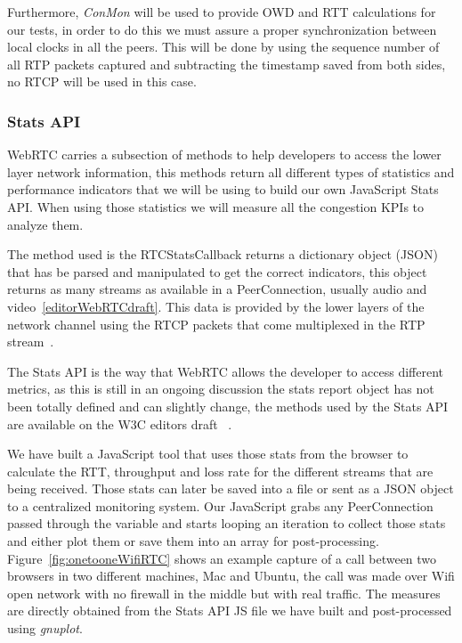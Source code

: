 Furthermore, {\it ConMon} will be used to provide OWD and RTT calculations for our tests, in order to do this we must assure a proper synchronization between local clocks in all the peers. This will be done by using the sequence number of all RTP packets captured and subtracting the timestamp saved from both sides, no RTCP will be used in this case.

\subsubsection{Stats API}

WebRTC carries a subsection of methods to help developers to access the lower layer network information, this methods return all different types of statistics and performance indicators that we will be using to build our own JavaScript Stats API. When using those statistics we will measure all the congestion KPIs to analyze them.

The method used is the RTCStatsCallback returns a dictionary object (JSON) that has be parsed and manipulated to get the correct indicators, this object returns as many streams as available in a PeerConnection, usually audio and video~\ref{editorWebRTCdraft}. This data is provided by the lower layers of the network channel using the RTCP packets that come multiplexed in the RTP stream~\cite{rtpusageIETF}.

The Stats API is the way that WebRTC allows the developer to access different metrics, as this is still in an ongoing discussion the stats report object has not been totally defined and can slightly change, the methods used by the Stats API are available on the W3C editors draft ~\cite{editorWebRTCdraft}. 

We have built a JavaScript tool that uses those stats from the browser to calculate the RTT, throughput and loss rate for the different streams that are being received. Those stats can later be saved into a file or sent as a JSON object to a centralized monitoring system. Our JavaScript grabs any PeerConnection passed through the variable and starts looping an iteration to collect those stats and either plot them or save them into an array for post-processing. 

Figure~\ref{fig:onetooneWifiRTC} shows an example capture of a call between two browsers in two different machines, Mac and Ubuntu, the call was made over Wifi open network with no firewall in the middle but with real traffic. The measures are directly obtained from the Stats API JS file we have built and post-processed using {\it gnuplot}.

